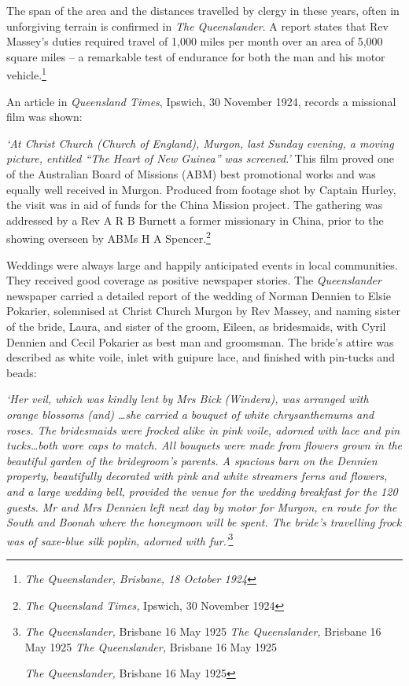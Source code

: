 The span of the area and the distances travelled by clergy in these years, often in unforgiving terrain is confirmed in \emph{The Queenslander}. A report states that Rev Massey's duties required travel of 1,000 miles per month over an area of 5,000 square miles -- a remarkable test of endurance for both the man and his motor vehicle.\footnote{\emph{The Queenslander, Brisbane, 18 October 1924}}

An article in \emph{Queensland Times}, Ipswich, 30 November 1924, records a missional film was shown:

\emph{`At Christ Church (Church of England), Murgon, last Sunday evening, a moving picture, entitled ``The Heart of New Guinea'' was screened.'} This film proved one of the Australian Board of Missions (ABM) best promotional works and was equally well received in Murgon. Produced from footage shot by Captain Hurley, the visit was in aid of funds for the China Mission project\emph{.} The gathering was addressed by a Rev A R B Burnett a former missionary in China, prior to the showing overseen by ABMs H A Spencer.\footnote{\emph{The Queensland Times,} Ipswich, 30 November 1924}

Weddings were always large and happily anticipated events in local communities. They received good coverage as positive newspaper stories. The \emph{Queenslander} newspaper carried a detailed report of the wedding of Norman Dennien to Elsie Pokarier, solemnised at Christ Church Murgon by Rev Massey, and naming sister of the bride, Laura, and sister of the groom, Eileen, as bridesmaids, with Cyril Dennien and Cecil Pokarier as best man and groomsman. The bride's attire was described as white voile, inlet with guipure lace, and finished with pin-tucks and beads:

\emph{`Her veil, which was kindly lent by Mrs Bick (Windera), was arranged with orange blossoms (and) \ldots she carried a bouquet of white chrysanthemums and roses. The bridesmaids were frocked alike in pink voile, adorned with lace and pin tucks\ldots both wore caps to match. All bouquets were made from flowers grown in the beautiful garden of the bridegroom's parents. A spacious barn on the Dennien property, beautifully decorated with pink and white streamers ferns and flowers, and a large wedding bell, provided the venue for the wedding breakfast for the 120 guests. Mr and Mrs Dennien left next day by motor for Murgon, en route for the South and Boonah where the honeymoon will be spent. The bride's travelling frock was of saxe-blue silk poplin, adorned with fur.'}\footnote{\emph{The Queenslander,} Brisbane 16 May 1925 \emph{The Queenslander,} Brisbane 16 May 1925 \emph{The Queenslander,} Brisbane 16 May 1925

  \emph{The Queenslander,} Brisbane 16 May 1925}

